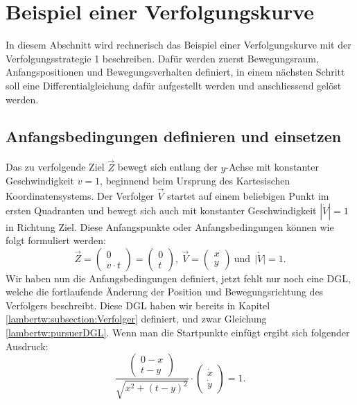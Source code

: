 %
%
%
\section{Beispiel einer Verfolgungskurve
\label{lambertw:section:teil4}}
In diesem Abschnitt wird rechnerisch das Beispiel einer Verfolgungskurve mit der Verfolgungsstrategie 1 beschreiben. Dafür werden zuerst Bewegungsraum, Anfangspositionen und Bewegungsverhalten definiert, in einem nächsten Schritt soll eine Differentialgleichung dafür aufgestellt werden und anschliessend gelöst werden.

\subsection{Anfangsbedingungen definieren und einsetzen
	\label{lambertw:subsection:Anfangsbedingungen}}
Das zu verfolgende Ziel \(\vec{Z}\) bewegt sich entlang der \(y\)-Achse mit konstanter Geschwindigkeit \(v = 1\), beginnend beim Ursprung des Kartesischen Koordinatensystems. Der Verfolger \(\vec{V}\) startet auf einem beliebigen Punkt im ersten Quadranten und bewegt sich auch mit konstanter Geschwindigkeit \(|\dot{V}| = 1\) in Richtung Ziel. Diese Anfangspunkte oder Anfangsbedingungen können wie folgt formuliert werden:
\begin{equation}
	\vec{Z}
	=
	\left( \begin{array}{c} 0 \\ v \cdot t \end{array} \right)
	=
	\left( \begin{array}{c} 0 \\ t \end{array} \right)
	,\:
	\vec{V}
	=
	\left( \begin{array}{c} x \\ y \end{array} \right)
	\:\text{und}\:\:
	\bigl| \dot{V} \bigl|
	=
	1.
	\label{lambertw:Anfangsbed}
\end{equation}
Wir haben nun die Anfangsbedingungen definiert, jetzt fehlt nur noch eine DGL, welche die fortlaufende Änderung der Position und Bewegungsrichtung des Verfolgers beschreibt. 
Diese DGL haben wir bereits in Kapitel \ref{lambertw:subsection:Verfolger} definiert, und zwar Gleichung \eqref{lambertw:pursuerDGL}. Wenn man die Startpunkte einfügt ergibt sich folgender Ausdruck:
\begin{equation}
	\frac{\left( \begin{array}{c} 0-x \\ t-y \end{array} \right)}{\sqrt{x^2 + (t-y)^2}}
	\cdot
	\left(\begin{array}{c} \dot{x} \\ \dot{y} \end{array}\right)
	=
	1.
	\label{lambertw:eqMitAnfangsbed}
\end{equation}

